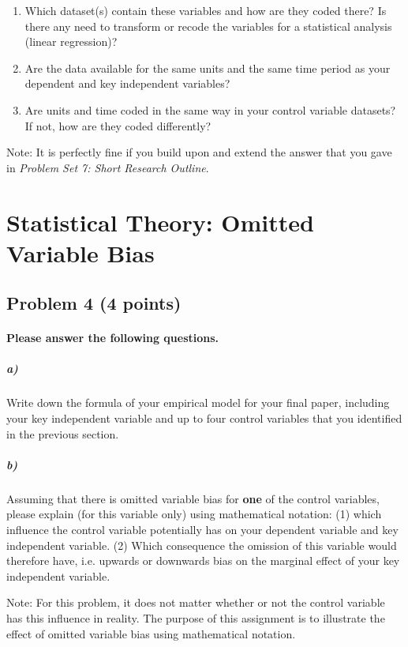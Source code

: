 \documentclass[12pt]{article}
\begin{document}
\begin{enumerate}
	\item Which dataset(s) contain these variables and how are they coded there? Is there any need to transform or recode the variables for a statistical analysis (linear regression)?
	\item Are the data available for the same units and the same time period as your dependent and key independent variables?
	\item Are units and time coded in the same way in your control variable datasets? If not, how are they coded differently?
\end{enumerate}

Note: It is perfectly fine if you build upon and extend the answer that you gave in \textit{Problem Set 7: Short Research Outline}.



\section*{Statistical Theory: Omitted Variable Bias}

\subsection*{Problem 4 (4 points)}

\paragraph{Please answer the following questions.}

\subparagraph{a)} Write down the formula of your empirical model for your final paper, including your key independent variable and up to four control variables that you identified in the previous section.

\subparagraph{b)} Assuming that there is omitted variable bias for \textbf{one} of the control variables, please explain (for this variable only) using mathematical notation: (1) which influence the control variable potentially has on your dependent variable and key independent variable. (2) Which consequence the omission of this variable would therefore have, i.e. upwards or downwards bias on the marginal effect of your key independent variable.

Note: For this problem, it does not matter whether or not the control variable has this influence in reality. The purpose of this assignment is to illustrate the effect of omitted variable bias using mathematical notation.
\end{document}
